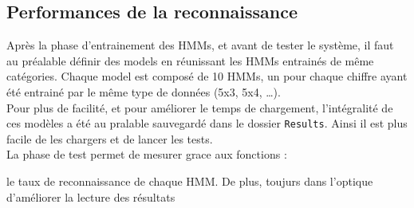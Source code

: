 \subsection{Performances de la reconnaissance}

Après la phase d'entrainement des HMMs, et avant de tester le système, il faut au préalable définir des models en réunissant les HMMs entrainés de même catégories. Chaque model est composé de 10 HMMs, un pour chaque chiffre ayant été entrainé par le même type de données (5x3, 5x4, \dots).\\

Pour plus de facilité, et pour améliorer le temps de chargement, l'intégralité de ces modèles a été au pralable sauvegardé dans le dossier \texttt{Results}. Ainsi il est plus facile de les chargers et de lancer les tests.\\

La phase de test permet de mesurer grace aux fonctions : 

le taux de reconnaissance de chaque HMM. De plus, toujurs dans l'optique d'améliorer la lecture des résultats

